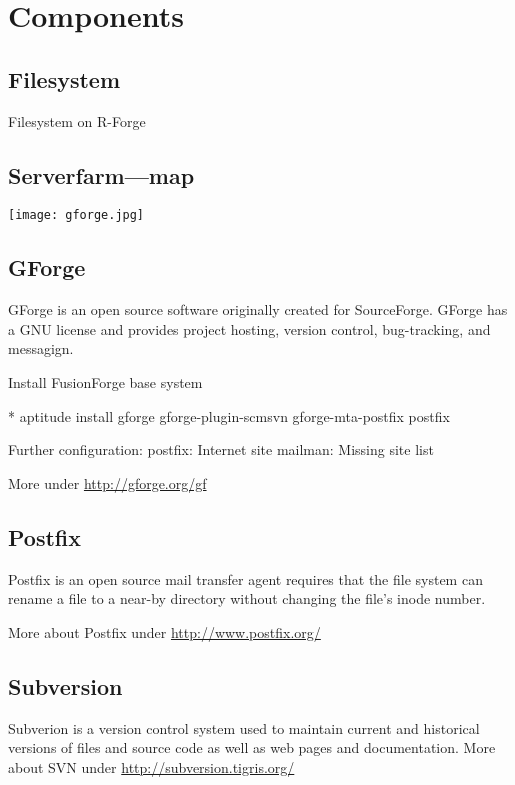 \documentclass[a4paper]{article}
\begin{document}
\section{Components}
\label{sec:registration}

\subsection{Filesystem}

Filesystem on R-Forge 

\subsection{Serverfarm---map}


\texttt{[image: gforge.jpg]}

\subsection{GForge}

GForge is an open source software originally created for
SourceForge. GForge has a GNU license and provides project hosting,
version control, bug-tracking, and messagign.


Install FusionForge base system


* aptitude install gforge gforge-plugin-scmsvn gforge-mta-postfix postfix

Further configuration: 
postfix: Internet site 
mailman: Missing site list 



\par More under \url{http://gforge.org/gf}

\subsection{Postfix}
Postfix is an open source mail transfer agent requires that the file system can rename a file to a near-by
directory without changing the file's inode number.

More about Postfix under \url{http://www.postfix.org/}

\subsection{Subversion}

Subverion is a version control system used to maintain current and
historical versions of files and source code as well as web pages and
documentation.
More about SVN under \url{http://subversion.tigris.org/}
\end{document}
